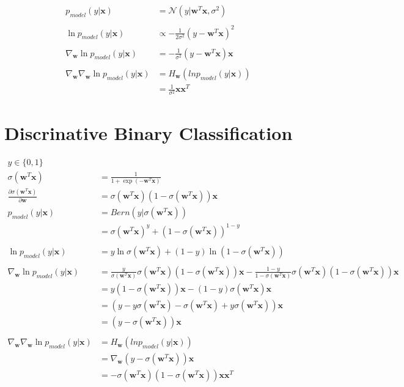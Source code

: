 \documentclass[a4]{article}
\begin{document}
\begin{equation}
\begin{aligned}
p_{model}(y|\bm{x}) &= \mathcal{N}(y | \bm{w}^T\bm{x}, \sigma^2)\\
\\
\ln p_{model}(y|\bm{x}) &\propto -\frac{1}{2\sigma^2}(y - \bm{w}^T\bm{x})^2\\
\\
\nabla_{\bm{w}}\ln p_{model}(y|\bm{x}) 
&= -\frac{1}{\sigma^2}(y - \bm{w}^T\bm{x})\bm{x}\\
\\
\nabla_{\bm{w}}\nabla_{\bm{w}}\ln p_{model}(y|\bm{x}) 
&= H_{\bm{w}}\left(ln p_{model}(y|\bm{x}) \right)\\
&=\frac{1}{\sigma^2}\bm{x}\bm{x}^T
\end{aligned}
\end{equation}


\section{Discrinative Binary Classification}

\begin{equation}
\begin{aligned}
y \in \{0,1\}\\
\sigma(\bm{w}^T\bm{x}) &= \frac{1}{1 + \exp(-\bm{w}^T\bm{x})}\\
\frac{\partial\sigma(\bm{w}^T\bm{x})}{\partial\bm{w}}
&= \sigma(\bm{w}^T\bm{x}) (1 - \sigma(\bm{w}^T\bm{x}))\bm{x}\\
p_{model}(y|\bm{x}) &= Bern\left(y|\sigma(\bm{w}^T\bm{x})\right)\\
&= \sigma(\bm{w}^T\bm{x})^y + (1 - \sigma(\bm{w}^T\bm{x}))^{1 -y}\\
\\
\ln p_{model}(y|\bm{x}) &=
y \ln\sigma(\bm{w}^T\bm{x}) + (1-y)\ln(1 - \sigma(\bm{w}^T\bm{x}))\\
\\
\nabla_{\bm{w}}\ln p_{model}(y|\bm{x}) 
&= \frac{y}{\sigma(\bm{w}^T\bm{x})}
\sigma(\bm{w}^T\bm{x})(1-\sigma(\bm{w}^T\bm{x}))\bm{x}
- \frac{1-y}{1 - \sigma(\bm{w}^T\bm{x})}
\sigma(\bm{w}^T\bm{x})(1-\sigma(\bm{w}^T\bm{x}))\bm{x}\\
&= y(1 - \sigma(\bm{w}^T\bm{x}))\bm{x} - (1-y)\sigma(\bm{w}^T\bm{x})\bm{x}\\
&= (y - y\sigma(\bm{w}^T\bm{x}) - 
    \sigma(\bm{w}^T\bm{x}) + y\sigma(\bm{w}^T\bm{x}))\bm{x}\\
&= (y - \sigma(\bm{w}^T\bm{x}))\bm{x}\\
\\
\nabla_{\bm{w}}\nabla_{\bm{w}}\ln p_{model}(y|\bm{x}) 
&= H_{\bm{w}}\left(ln p_{model}(y|\bm{x}) \right)\\
&= \nabla_{\bm{w}}(y - \sigma(\bm{w}^T\bm{x}))\bm{x}\\
&= - \sigma(\bm{w}^T\bm{x})(1 - \sigma(\bm{w}^T\bm{x}))\bm{x}\bm{x}^T\\
\end{aligned}
\end{equation}
\end{document}
